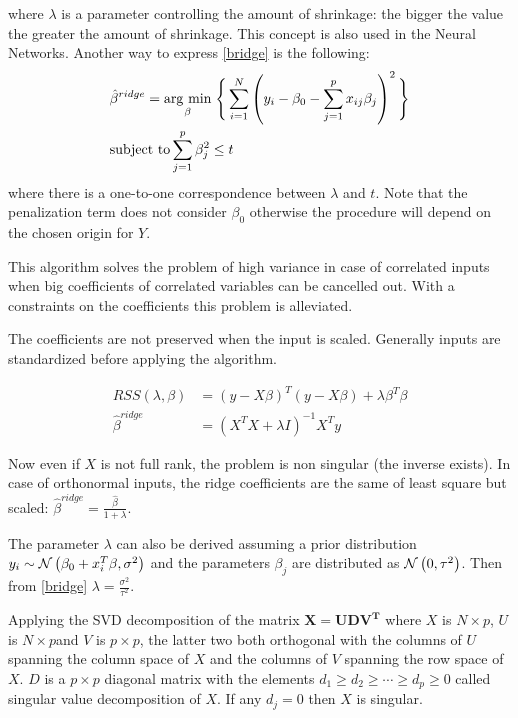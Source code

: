 where $\lambda$ is a parameter controlling the amount of shrinkage: the bigger the value the greater the amount of shrinkage. This concept is also used in the Neural Networks. Another way to express \autoref{bridge} is the following:
\begin{equation}
\begin{aligned}
&\hat{\beta}^{ridge} = \underset{\beta}{\operatorname{arg}\,\operatorname{min}}\; \Bigg\lbrace \sum_{i=1}^N \left( y_i -  \beta_0 - \sum_{j=1}^p x_{ij} \beta_j\right)^2 \Bigg\rbrace\\
&\text{subject to} \sum_{j=1}^p \beta_j^2 \le t
\end{aligned}
\end{equation}
where there is a one-to-one correspondence between $\lambda$ and $t$. Note that the penalization term does not consider $\beta_0$ otherwise the procedure will depend on the chosen origin for $Y$.

This algorithm solves the problem of high variance in case of correlated inputs when big coefficients of correlated variables can be cancelled out. With a constraints on the coefficients this problem is alleviated.

The coefficients are not preserved when the input is scaled. Generally inputs are standardized before applying the algorithm.

\begin{align}
RSS(\lambda, \beta)       &= \left( y - X \beta \right)^T \left( y - X\beta \right) + \lambda \beta^T \beta \\
\hat{\beta}^{ridge} &= \left( X^TX + \lambda I \right)^{-1} X^Ty
\end{align}

Now even if $X$ is not full rank, the problem is non singular (the inverse exists).
In case of orthonormal inputs, the ridge coefficients are the same of least square but scaled: $\hat{\beta}^{ridge}  = \frac{\hat{\beta}}{1+\lambda}$.

The parameter $\lambda$ can also be derived assuming a prior distribution $y_i  \sim  \CMcal{N}\left( \beta_0+x_i^T\beta, \sigma^2\right)$ and the parameters $\beta_j$ are distributed as $\CMcal{N}\left( 0, \tau^2\right)$. Then from \autoref{bridge} $\lambda = \frac{\sigma^2}{\tau^2}$.

Applying the SVD decomposition of the matrix $\mathbf{X =  UDV^T}$ where $X$ is $N\times p$, $U$ is $N\times p$and $V$ is $p\times p$, the latter two both orthogonal with the columns of $U$ spanning the column space of $X$ and the columns of $V$ spanning the row space of $X$. $D$ is a $p\times p$ diagonal matrix with the elements $d_1\ge d_2 \ge \cdots \ge d_p\ge 0$ called singular value decomposition of $X$. If any $d_j = 0$ then $X$ is singular.

